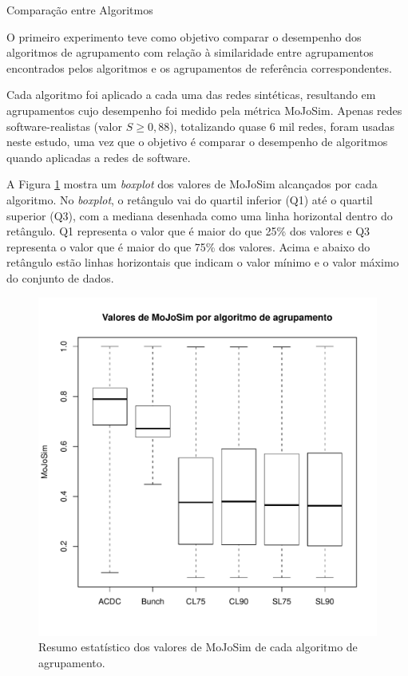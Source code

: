 \begin{section}{Comparação entre Algoritmos}

O primeiro experimento teve como objetivo comparar o desempenho dos algoritmos de agrupamento com relação à similaridade entre agrupamentos encontrados pelos algoritmos e os agrupamentos de referência correspondentes.

Cada algoritmo foi aplicado a cada uma das redes sintéticas, resultando em agrupamentos cujo desempenho foi medido pela métrica MoJoSim. Apenas redes software-realistas (valor $S \ge 0,88$), totalizando quase 6 mil redes, foram usadas neste estudo, uma vez que o objetivo é comparar o desempenho de algoritmos quando aplicadas a redes de software.

A Figura \ref{fig:box-mojo-por-alg} mostra um \emph{boxplot} dos valores de MoJoSim alcançados por cada algoritmo. No \emph{boxplot}, o retângulo vai do quartil inferior (Q1) até o quartil superior (Q3), com a mediana desenhada como uma linha horizontal dentro do retângulo. Q1 representa o valor que é maior do que 25\% dos valores e Q3 representa o valor que é maior do que 75\% dos valores. Acima e abaixo do retângulo estão linhas horizontais que indicam o valor mínimo e o valor máximo do conjunto de dados. %

\begin{figure}[htbp]
	\centering
		\includegraphics[scale=0.5]{figuras/box-mojo-por-alg}
	\caption{Resumo estatístico dos valores de MoJoSim de cada algoritmo de agrupamento.}
	\label{fig:box-mojo-por-alg}
\end{figure}



\end{section}
